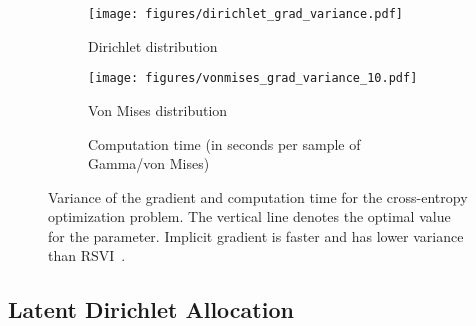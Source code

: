 \documentclass{article}
\begin{document}
\begin{figure}
    \centering
    \begin{subfigure}[b]{0.31\linewidth}
        \texttt{[image: figures/dirichlet\_grad\_variance.pdf]}
        \caption{Dirichlet distribution}
    \end{subfigure}
    \begin{subfigure}[b]{0.31\linewidth}
        \texttt{[image: figures/vonmises\_grad\_variance\_10.pdf]}
        \caption{Von Mises distribution}
    \end{subfigure}
    \begin{subfigure}[b]{0.35\linewidth}
    \centering
    
    \caption{Computation time (in seconds per sample of Gamma/von Mises)}
    \end{subfigure}
    \caption{Variance of the gradient and computation time for the cross-entropy optimization problem. The vertical line denotes the optimal value for the parameter. Implicit gradient is faster and has lower variance than RSVI~\cite{naesseth2017reparameterization}.}
    \label{fig:cross-entropy-variance}
\end{figure}

\subsection{Latent Dirichlet Allocation}
\label{sec:lda}
\end{document}
